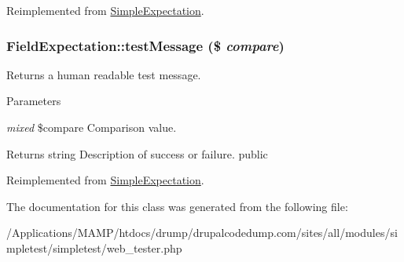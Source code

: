 Reimplemented from \hyperlink{class_simple_expectation_aa2b98f827e7487ebe12cedb9ad39d061}{SimpleExpectation}.\hypertarget{class_field_expectation_a98958cce79aa0e8f98da5c8bb53c21fa}{
\subsubsection[{testMessage}]{\setlength{\rightskip}{0pt plus 5cm}FieldExpectation::testMessage (\$ {\em compare})}}
\label{class_field_expectation_a98958cce79aa0e8f98da5c8bb53c21fa}
Returns a human readable test message. 
\begin{DoxyParams}{Parameters}
\item[{\em mixed}]\$compare Comparison value. \end{DoxyParams}
\begin{DoxyReturn}{Returns}
string Description of success or failure.  public 
\end{DoxyReturn}


Reimplemented from \hyperlink{class_simple_expectation_a15b69edf659c76f6543aa98d8d85b025}{SimpleExpectation}.

The documentation for this class was generated from the following file:\begin{DoxyCompactItemize}
\item 
/Applications/MAMP/htdocs/drump/drupalcodedump.com/sites/all/modules/simpletest/simpletest/web\_\-tester.php\end{DoxyCompactItemize}
